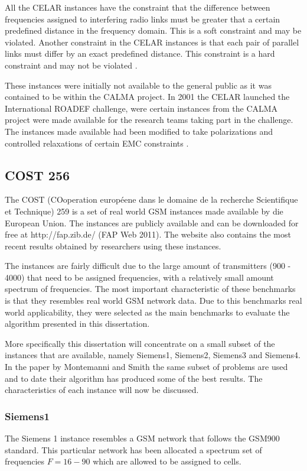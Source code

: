 All the CELAR instances have the constraint that the difference between frequencies assigned to interfering radio links must be greater that a certain predefined distance in the frequency domain. This is a soft constraint and may be violated. Another constraint in the CELAR instances is that each pair of parallel links must differ by an exact predefined distance. This constraint is a hard constraint and may not be violated \cite{DynamicFAP}.

These instances were initially not available to the general public as it was contained to be within the CALMA project. In 2001 the CELAR launched the International ROADEF challenge, were certain instances from the CALMA project were made available for the research teams taking part in the challenge. The instances made available had been modified to take polarizations and controlled relaxations of certain EMC constraints \cite{LowerPolarFAP}.
\subsection{COST 256}
\label{sec:COST259}
The COST (COoperation européene dans le domaine de la recherche Scientifique et Technique) 259 is a set of real world GSM instances made available by die European Union. The instances are publicly available and can  be downloaded for free at http://fap.zib.de/ (FAP Web 2011). The website also contains the most recent results obtained by researchers using these instances\cite{Karen2004,Eisenblatter}.

The instances are fairly difficult due to the large amount of transmitters (900 - 4000) that need to be assigned frequencies, with a relatively small amount spectrum of frequencies. The most important characteristic of these benchmarks is that they resembles real world GSM network data. Due to this benchmarks real world applicability, they were selected as the main benchmarks to evaluate the algorithm presented in this dissertation.

More specifically this dissertation will concentrate on a small subset of the instances that are available, namely Siemens1, Siemens2, Siemens3 and Siemens4. In the paper by Montemanni and Smith \cite{TabuMontemanniSmith} the same subset of problems are used and to date their algorithm has produced some of the best results. The characteristics of each instance will now be discussed.
\subsubsection{Siemens1}
The Siemens 1 instance resembles a GSM network that follows the GSM900 standard. This particular network has been allocated a spectrum set of frequencies $F = {16-90}$ which are allowed to be assigned to cells. 

